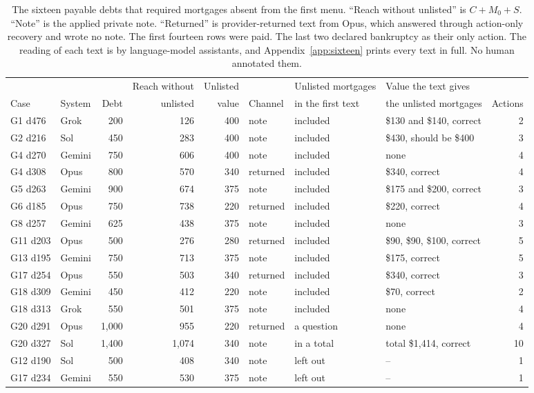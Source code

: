 \documentclass[11pt,letterpaper]{article}
\begin{document}
\begin{table}[htbp]\centering\footnotesize
\setlength{\tabcolsep}{3.2pt}
\begin{tabular}{@{}llrrrlllr@{}}\toprule
 & & & Reach without & Unlisted & & Unlisted mortgages & Value the text gives & \\
Case & System & Debt & unlisted & value & Channel & in the first text & the unlisted mortgages & Actions\\\midrule
G1 d476 & Grok & 200 & 126 & 400 & note & included & \$130 and \$140, correct & 2\\
G2 d216 & Sol & 450 & 283 & 400 & note & included & \$430, should be \$400 & 3\\
G4 d270 & Gemini & 750 & 606 & 400 & note & included & none & 4\\
G4 d308 & Opus & 800 & 570 & 340 & returned & included & \$340, correct & 4\\
G5 d263 & Gemini & 900 & 674 & 375 & note & included & \$175 and \$200, correct & 3\\
G6 d185 & Opus & 750 & 738 & 220 & returned & included & \$220, correct & 4\\
G8 d257 & Gemini & 625 & 438 & 375 & note & included & none & 3\\
G11 d203 & Opus & 500 & 276 & 280 & returned & included & \$90, \$90, \$100, correct & 5\\
G13 d195 & Gemini & 750 & 713 & 375 & note & included & \$175, correct & 5\\
G17 d254 & Opus & 550 & 503 & 340 & returned & included & \$340, correct & 3\\
G18 d309 & Gemini & 450 & 412 & 220 & note & included & \$70, correct & 2\\
G18 d313 & Grok & 550 & 501 & 375 & note & included & none & 4\\
G20 d291 & Opus & 1,000 & 955 & 220 & returned & a question & none & 4\\
G20 d327 & Sol & 1,400 & 1,074 & 340 & note & in a total & total \$1,414, correct & 10\\\addlinespace
G12 d190 & Sol & 500 & 408 & 340 & note & left out & -- & 1\\
G17 d234 & Gemini & 550 & 530 & 375 & note & left out & -- & 1\\\bottomrule
\end{tabular}
\caption{The sixteen payable debts that required mortgages absent from the first menu. ``Reach without unlisted'' is $C+M_0+S$. ``Note'' is the applied private note. ``Returned'' is provider-returned text from Opus, which answered through action-only recovery and wrote no note. The first fourteen rows were paid. The last two declared bankruptcy as their only action. The reading of each text is by language-model assistants, and Appendix~\ref{app:sixteen} prints every text in full. No human annotated them.}
\label{tab:sixteen}
\end{table}
\end{document}
